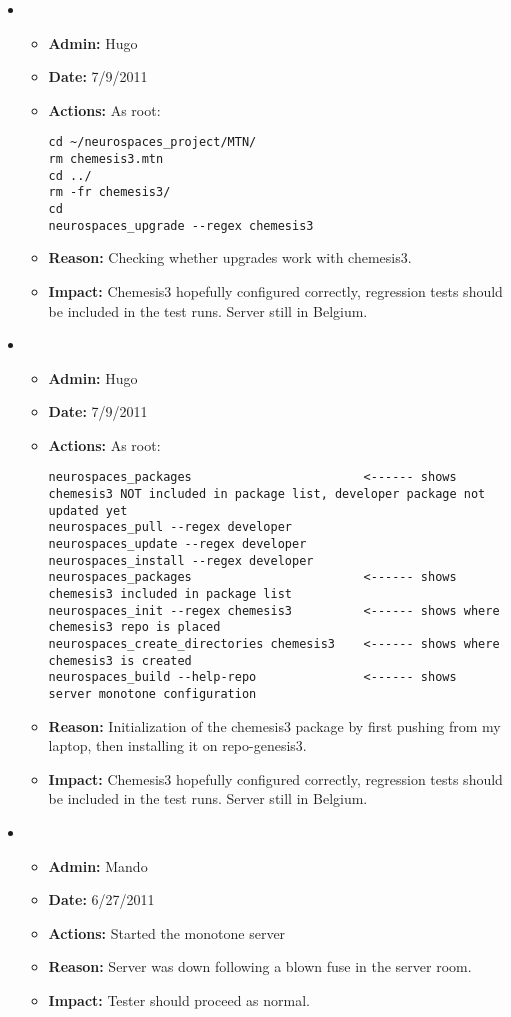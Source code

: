 \documentclass[12pt]{article}
\begin{document}
\begin{itemize}
\item
  \begin{itemize}
  \item[] {\bf Admin:} Hugo
  \item[] {\bf Date:} 7/9/2011
  \item[] {\bf Actions:} As root:
\begin{verbatim}
cd ~/neurospaces_project/MTN/
rm chemesis3.mtn
cd ../
rm -fr chemesis3/
cd
neurospaces_upgrade --regex chemesis3
\end{verbatim}
  \item[] {\bf Reason:} Checking whether upgrades work with
    chemesis3.
  \item[] {\bf Impact:} Chemesis3 hopefully configured correctly,
    regression tests should be included in the test runs.  Server
    still in Belgium.
  \end{itemize}


\item
  \begin{itemize}
  \item[] {\bf Admin:} Hugo
  \item[] {\bf Date:} 7/9/2011 
  \item[] {\bf Actions:} As root:
\begin{verbatim}
neurospaces_packages                        <------ shows chemesis3 NOT included in package list, developer package not updated yet
neurospaces_pull --regex developer
neurospaces_update --regex developer
neurospaces_install --regex developer
neurospaces_packages                        <------ shows chemesis3 included in package list
neurospaces_init --regex chemesis3          <------ shows where chemesis3 repo is placed
neurospaces_create_directories chemesis3    <------ shows where chemesis3 is created
neurospaces_build --help-repo               <------ shows server monotone configuration
\end{verbatim}
  \item[] {\bf Reason:} Initialization of the chemesis3 package by
    first pushing from my laptop, then installing it on repo-genesis3.
  \item[] {\bf Impact:} Chemesis3 hopefully configured correctly,
    regression tests should be included in the test runs.  Server
    still in Belgium.
  \end{itemize}


\item
  \begin{itemize}
  \item[] {\bf Admin:} Mando
  \item[] {\bf Date:} 6/27/2011
  \item[] {\bf Actions:} Started the monotone server
  \item[] {\bf Reason:} Server was down following a blown fuse in the
    server room.
  \item[] {\bf Impact:} Tester should proceed as normal.
  \end{itemize}
  

\end{itemize}
\end{document}
